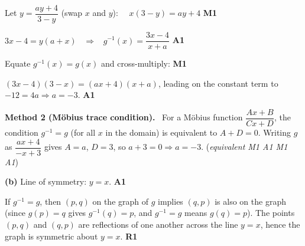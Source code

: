 \documentclass[12pt, twoside]{article}
\begin{document}
Let $y=\dfrac{ay+4}{3-y}$ (swap $x$ and $y$): \ \ $x(3-y)=ay+4$ \hfill \textbf{M1}

$3x-4=y(a+x)$ \ $\Rightarrow$ \ $g^{-1}(x)=\dfrac{3x-4}{x+a}$ \hfill \textbf{A1}

Equate $g^{-1}(x)=g(x)$ and cross-multiply: \hfill \textbf{M1}

$(3x-4)(3-x)=(ax+4)(x+a)$, leading on the constant term to
$-12=4a \Rightarrow a=-3$. \hfill \textbf{A1}

\smallskip

\textbf{Method 2 (M\"obius trace condition).} \ For a M\"obius function
$\dfrac{Ax+B}{Cx+D}$, the condition $g^{-1}=g$ (for all $x$ in the domain) is
equivalent to $A+D=0$. Writing $g$ as $\dfrac{ax+4}{-x+3}$ gives $A=a$, $D=3$,
so $a+3=0 \Rightarrow a=-3$. \hfill (\emph{equivalent M1 A1 M1 A1})

\medskip

\textbf{(b)} Line of symmetry: $y=x$. \hfill \textbf{A1}

If $g^{-1}=g$, then $(p,q)$ on the graph of $g$ implies $(q,p)$ is also on the
graph (since $g(p)=q$ gives $g^{-1}(q)=p$, and $g^{-1}=g$ means $g(q)=p$). The
points $(p,q)$ and $(q,p)$ are reflections of one another across the line $y=x$,
hence the graph is symmetric about $y=x$. \hfill \textbf{R1}
\end{document}
